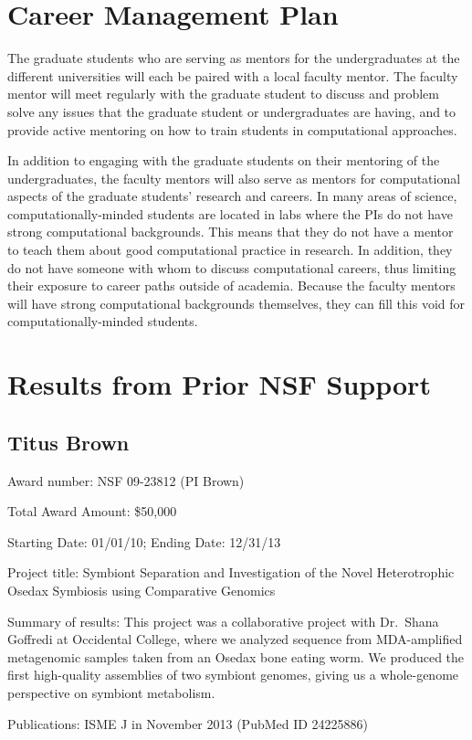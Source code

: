 \documentclass{proposalnsf}
\newlength{\up}
\begin{document}
\section{Career Management Plan}

The graduate students who are serving as mentors for the
undergraduates at the different universities will each be paired with
a local faculty mentor. The faculty mentor will meet regularly with
the graduate student to discuss and problem solve any issues that the
graduate student or undergraduates are having, and to provide active
mentoring on how to train students in computational approaches.

In addition to engaging with the graduate students on their mentoring
of the undergraduates, the faculty mentors will also serve as
mentors for computational aspects of the graduate students' research
and careers. In many areas of science, computationally-minded students
are located in labs where the PIs do not have strong computational
backgrounds. This means that they do not have a mentor to teach them
about good computational practice in research. In addition, they do
not have someone with whom to discuss computational careers, thus limiting
their exposure to career paths outside of academia. Because the
faculty mentors will have strong computational backgrounds themselves,
they can fill this void for computationally-minded students.

\section{Results from Prior NSF Support}

\subsection{Titus Brown}
\begin{compactitem}
\item Award number: NSF 09-23812 (PI Brown)
\item Total Award Amount: \$50,000
\item Starting Date: 01/01/10; Ending Date: 12/31/13
\item Project title: Symbiont Separation and Investigation of the Novel Heterotrophic Osedax Symbiosis using Comparative Genomics
\item Summary of results: This project was a collaborative project with Dr.\ Shana Goffredi at Occidental College, where we analyzed sequence from MDA-amplified metagenomic samples taken from an Osedax bone eating worm. We produced the first high-quality assemblies of two symbiont genomes, giving us a whole-genome perspective on symbiont metabolism.
\item Publications: ISME J in November 2013 (PubMed ID 24225886)
\end{compactitem}
\end{document}
